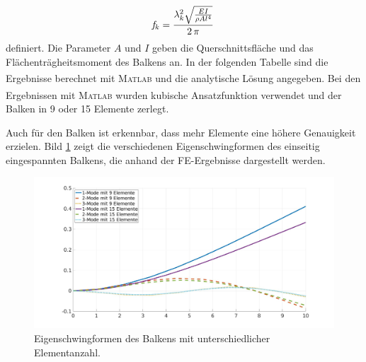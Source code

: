\documentclass[a4paper,10pt,twoside]{article}
\numberwithin{equation}{section} %
\numberwithin{figure}{section}   %
\numberwithin{table}{section}    %
\newcommand{\Matlab}{\textsc{Matlab}\textsuperscript{\textregistered} }
\begin{document}
	\begin{equation}\label{equ:analytisch-eigenfrequenz-balken}
	\renewcommand\arraystretch{1.4}
	\mathit{f}_{k} = \frac{\lambda_{k}^{2}\sqrt{\frac{EI}{\rho A l^{4}}}}{2 \, \pi} \,
	\end{equation}
	definiert. Die Parameter $A$ und $ I $ geben die Querschnittsfläche und das Flächenträgheitsmoment des Balkens an. In der folgenden Tabelle sind die Ergebnisse berechnet mit \Matlab und die analytische Lösung angegeben. Bei den Ergebnissen mit \Matlab wurden kubische Ansatzfunktion verwendet und der Balken in 9 oder 15 Elemente zerlegt.
	\begin{table}[H]\label{tab:balken-RB}
		\renewcommand\arraystretch{1.2}
		\centering
		\caption{Eigenfrequenzen der Biegeschwingungen eines einseitig eingespannten Balkens.}
	\end{table}
    Auch für den Balken ist erkennbar, dass mehr Elemente eine höhere Genauigkeit erzielen. Bild \ref{fig:balken-9-15} zeigt die verschiedenen Eigenschwingformen des einseitig eingespannten Balkens, die anhand der FE-Ergebnisse dargestellt werden.

	\begin{figure}[H]
		\centering
		\includegraphics[width=1.1\linewidth, height=0.45\textheight]{Balken_9_15}
		\caption{Eigenschwingformen des Balkens mit unterschiedlicher Elementanzahl.}
		\label{fig:balken-9-15}
	\end{figure}
\end{document}
